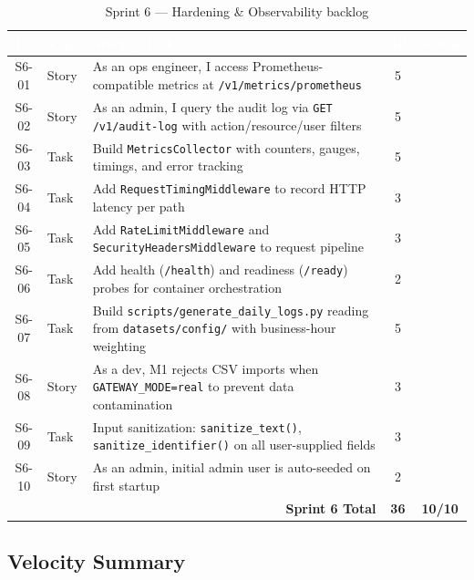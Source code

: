 \documentclass[12pt,a4paper,twoside]{report}
\newcommand{\cmark}{\ding{51}}
\begin{document}
\begin{table}[H]
\centering
\small
\begin{tabularx}{\textwidth}{|c|l|X|c|c|}
\hline
\rowcolor{tabheader}
\textcolor{white}{\textbf{ID}} &
\textcolor{white}{\textbf{Type}} &
\textcolor{white}{\textbf{Story / Task}} &
\textcolor{white}{\textbf{SP}} &
\textcolor{white}{\textbf{Status}} \\
\hline
S6-01 & Story & As an ops engineer, I access Prometheus-compatible metrics at \texttt{/v1/metrics/prometheus} & 5 & \cmark \\
\hline
S6-02 & Story & As an admin, I query the audit log via \texttt{GET /v1/audit-log} with action/resource/user filters & 5 & \cmark \\
\hline
S6-03 & Task & Build \texttt{MetricsCollector} with counters, gauges, timings, and error tracking & 5 & \cmark \\
\hline
S6-04 & Task & Add \texttt{RequestTimingMiddleware} to record HTTP latency per path & 3 & \cmark \\
\hline
S6-05 & Task & Add \texttt{RateLimitMiddleware} and \texttt{SecurityHeadersMiddleware} to request pipeline & 3 & \cmark \\
\hline
S6-06 & Task & Add health (\texttt{/health}) and readiness (\texttt{/ready}) probes for container orchestration & 2 & \cmark \\
\hline
S6-07 & Task & Build \texttt{scripts/generate\_daily\_logs.py} reading from \texttt{datasets/config/} with business-hour weighting & 5 & \cmark \\
\hline
S6-08 & Story & As a dev, M1 rejects CSV imports when \texttt{GATEWAY\_MODE=real} to prevent data contamination & 3 & \cmark \\
\hline
S6-09 & Task & Input sanitization: \texttt{sanitize\_text()}, \texttt{sanitize\_identifier()} on all user-supplied fields & 3 & \cmark \\
\hline
S6-10 & Story & As an admin, initial admin user is auto-seeded on first startup & 2 & \cmark \\
\hline
\multicolumn{3}{|r|}{\textbf{Sprint 6 Total}} & \textbf{36} & \textbf{10/10} \\
\hline
\end{tabularx}
\caption{Sprint 6 — Hardening \& Observability backlog}
\end{table}

\subsection{Velocity Summary}
\end{document}
